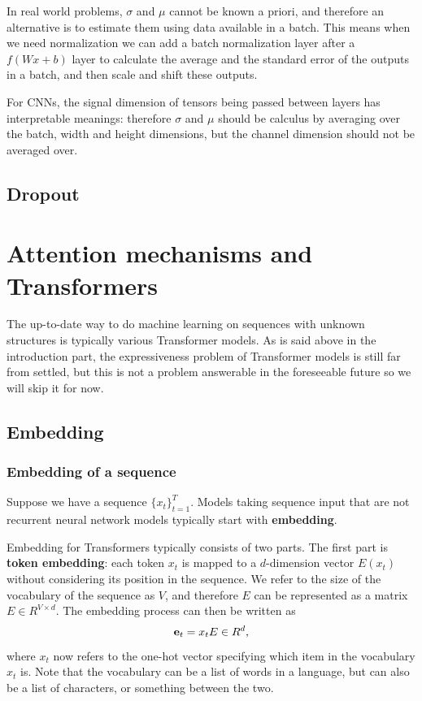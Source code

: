 \documentclass[hyperref, a4paper, 12pt]{report}
\newcommand*{\concept}[1]{{\textbf{#1}}}
\def\mathbb#1{#1}%
\begin{document}
In real world problems, $\sigma$ and $\mu$ cannot be known a priori,
and therefore an alternative is to estimate them using data available in a batch.
This means when we need normalization we can add a batch normalization layer after a $f(Wx + b)$ layer
to calculate the average and the standard error of the outputs in a batch,
and then scale and shift these outputs.

For CNNs, the signal dimension of tensors being passed between layers has interpretable meanings:
therefore $\sigma$ and $\mu$ should be calculus by averaging over the batch, width and height dimensions,
but the channel dimension should not be averaged over.

\section{Dropout}

\chapter{Attention mechanisms and Transformers}

The up-to-date way to do machine learning on sequences with unknown structures
is typically various Transformer models.
As is said above in the introduction part, the expressiveness problem of  Transformer models is still far from settled,
but this is not a problem answerable in the foreseeable future so we will skip it for now.

\section{Embedding}

\subsection{Embedding of a sequence}

Suppose we have a sequence $\{x_t\}_{t=1}^T$.
Models taking sequence input that are not recurrent neural network models typically start with \concept{embedding}.

Embedding for Transformers typically consists of two parts.
The first part is \concept{token embedding}:
each token $x_t$ is mapped to a $d$-dimension vector $E(x_t)$ without considering its position in the sequence.
We refer to the size of the vocabulary of the sequence as $V$,
and therefore $E$ can be represented as a matrix $E \in \mathbb{R}^{V \times d}$.
The embedding process can then be written as 
\begin{equation}
    \vb{e}_t = x_t E \in \mathbb{R}^d,
\end{equation}
where $x_t$ now refers to the one-hot vector specifying which item in the vocabulary $x_t$ is.
Note that the vocabulary can be a list of words in a language,
but can also be a list of characters, or something between the two.
\end{document}

